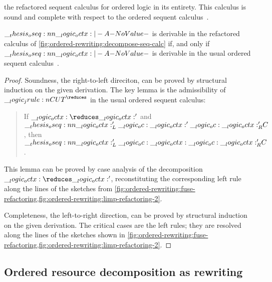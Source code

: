  the refactored sequent calculus for ordered logic in its entirety.
This calculus is sound and complete with respect to the ordered sequent calculus~.
%
\begin{theorem}
  $\oseq{\octx |- A}$ is derivable in the refactored calculus of \cref{fig:ordered-rewriting:decompose-seq-calc} if, and only if $\oseq{\octx |- A}$ is derivable in the usual ordered sequent calculus~.
\end{theorem}
%
\begin{proof}
  Soundness, the right-to-left direciton, can be proved by structural induction on the given derivation.
  The key lemma is the admissibility of $\jrule{CUT}^{\reduces}$ in the usual ordered sequent calculus:
  \begin{quotation}
    \normalsize If $\octx \reduces \octx'$ and $\oseq{\octx'_L \oc \octx' \oc \octx'_R |- C}$, then $\oseq{\octx'_L \oc \octx \oc \octx'_R |- C}$.
  \end{quotation}
  This lemma can be proved by case analysis of the decomposition $\octx \reduces \octx'$, reconstituting the corresponding left rule along the lines of the sketches from \cref{fig:ordered-rewriting:fuse-refactoring,fig:ordered-rewriting:limp-refactoring-2}.

%
%
  Completeness, the left-to-right direction, can be proved by structural induction on the given derivation.
  The critical cases are the left rules; they are resolved along the lines of the sketches shown in \cref{fig:ordered-rewriting:fuse-refactoring,fig:ordered-rewriting:limp-refactoring-2}.
\end{proof}

\subsection{Ordered resource decomposition as rewriting}

